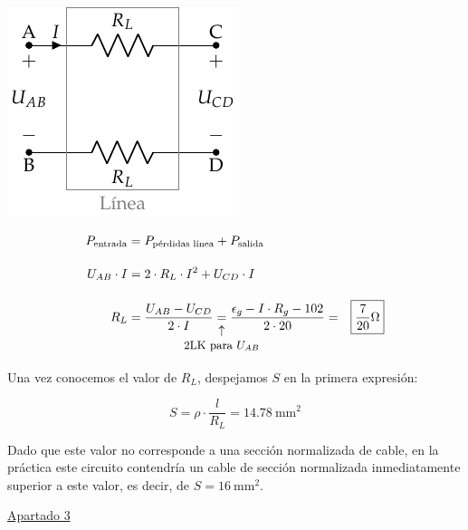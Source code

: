 \documentclass[10pt]{article}
\begin{document}
\begin{itemize}
    \vspace{2mm}
    \begin{minipage}{0.4\linewidth}
    \begin{center}
      \includegraphics[scale=1.2]{figs/linea_lkv.pdf}
    \end{center}
    \end{minipage}
    \begin{minipage}{0.6\linewidth}
    \begin{align*}
        P_{\textrm{entrada}} &= P_{\textrm{pérdidas línea}} + P_{\textrm{salida}}\\[10pt]
        U_{AB} \cdot I &= 2 \cdot R_L \cdot I^2 + U_{CD} \cdot I\\[10pt] 
        R_L &= \frac{U_{AB}-U_{CD}}{2 \cdot I} \underarrow[=][\uparrow]{\small 2LK para \ensuremath{U_{AB}} } \frac{\epsilon_g - I\cdot R_g - 102}{2 \cdot 20} = \Aboxed{ {\frac{7}{20}}\si{\ohm} }
    \end{align*}
    \end{minipage}
\end{itemize}

Una vez conocemos el valor de $R_L$, despejamos $S$ en la primera expresión:

\[
  S = \rho \cdot \frac{l}{R_L} = \boxed{ \qty{14.78}{\milli\meter\squared} }
\]

Dado que este valor no corresponde a una sección normalizada de cable, en la práctica este circuito contendría un cable de sección normalizada inmediatamente superior a este valor, es decir, de $S = \qty{16}{\milli\meter\squared}$.

\vspace{6mm}

\underline{Apartado 3}
\end{document}
